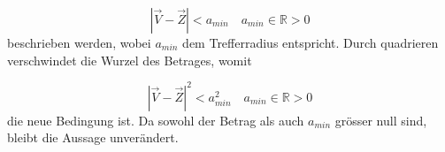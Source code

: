 \begin{equation}
    |\vec{V}-\vec{Z}|<a_{min} \quad a_{min}\in\mathbb{R}>0
\end{equation}
%
beschrieben werden, wobei $a_{min}$ dem Trefferradius entspricht.
Durch quadrieren verschwindet die Wurzel des Betrages, womit

\begin{equation}
    |\vec{V}-\vec{Z}|^2<a_{min}^2 \quad a_{min}\in \mathbb{R} > 0
\end{equation}
%
die neue Bedingung ist.
Da sowohl der Betrag als auch $a_{min}$ grösser null sind, bleibt die Aussage unverändert.





